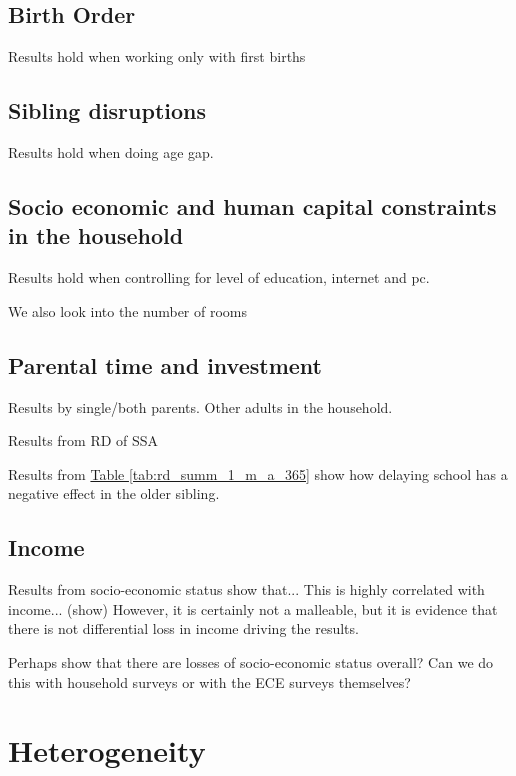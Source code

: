 \subsection{Birth Order}

Results hold when working only with first births

\subsection{Sibling disruptions}

Results hold when doing age gap.

\subsection{Socio economic and human capital constraints in the household}

Results hold when controlling for level of education, internet and pc.

We also look into the number of rooms\

\subsection{Parental time and investment}

Results by single/both parents. Other adults in the household.

Results from RD of SSA

Results from \hyperref[tab:rd_summ_1_m_a_365]{Table \ref{tab:rd_summ_1_m_a_365}} show how delaying school has a negative effect in the older sibling. 

\subsection{Income}

Results from socio-economic status show that... 
This is highly correlated with income... (show)
However, it is certainly not a malleable, but it is evidence that there is not differential loss in income driving the results.

Perhaps show that there are losses of socio-economic status overall? Can we do this with household surveys or with the ECE surveys themselves?

\section{Heterogeneity}\label{sec:heterogeneity}

